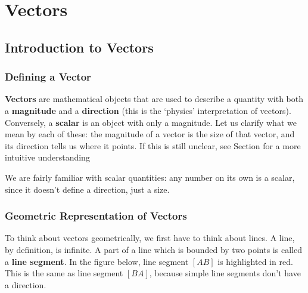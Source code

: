 \documentclass[
	11pt, %
	fleqn, %
	a4paper, %
]{../../styles/LegrandOrangeBook}
\begin{document}

\part{Vectors}


\chapter{Introduction to Vectors}


\section{Defining a Vector}

\textbf{Vectors} are mathematical objects that are used to describe a quantity with both a \textbf{magnitude} and a \textbf{direction} (this is the `physics' interpretation of vectors). Conversely, a \textbf{scalar} is an object with only a magnitude. Let us clarify what we mean by each of these: the magnitude of a vector is the size of that vector, and its direction tells us where it points. If this is still unclear, see Section for a more intuitive understanding


We are fairly familiar with scalar quantities: any number on its own is a scalar, since it doesn't define a direction, just a size.

\section{Geometric Representation of Vectors}

To think about vectors geometrically, we first have to think about lines. A line, by definition, is infinite. A part of a line which is bounded by two points is called a \textbf{line segment}. In the figure below, line segment $[AB]$ is highlighted in red. This is the same as line segment $[BA]$, because simple line segments don't have a direction.
\end{document}
